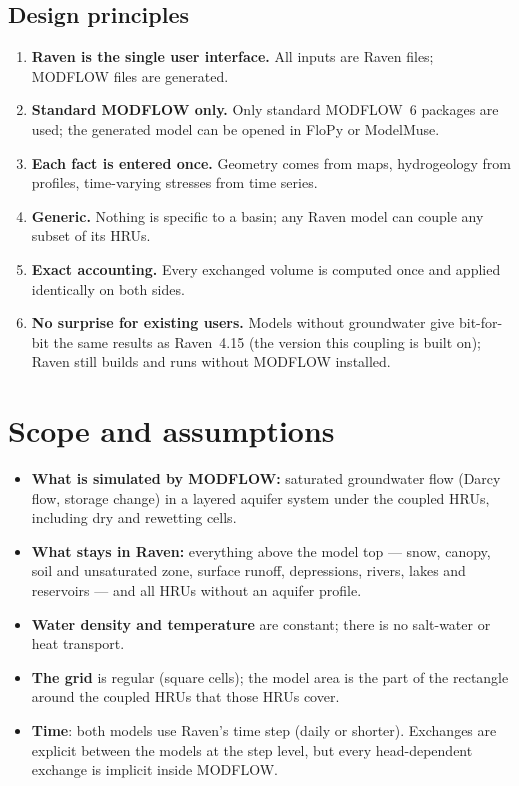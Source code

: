 \subsection{Design principles}
\begin{enumerate}
\item \textbf{Raven is the single user interface.} All inputs are Raven files; MODFLOW files are generated.
\item \textbf{Standard MODFLOW only.} Only standard MODFLOW~6 packages are used; the generated model can be opened in
FloPy or ModelMuse.
\item \textbf{Each fact is entered once.} Geometry comes from maps, hydrogeology from profiles, time-varying stresses
from time series.
\item \textbf{Generic.} Nothing is specific to a basin; any Raven model can couple any subset of its HRUs.
\item \textbf{Exact accounting.} Every exchanged volume is computed once and applied identically on both sides.
\item \textbf{No surprise for existing users.} Models without groundwater give bit-for-bit the same results as
Raven~4.15 (the version this coupling is built on); Raven still builds and runs without MODFLOW installed.
\end{enumerate}

\section{Scope and assumptions}
\begin{itemize}
\item \textbf{What is simulated by MODFLOW:} saturated groundwater flow (Darcy flow, storage change) in a layered aquifer
system under the coupled HRUs, including dry and rewetting cells.
\item \textbf{What stays in Raven:} everything above the model top --- snow, canopy, soil and unsaturated zone, surface
runoff, depressions, rivers, lakes and reservoirs --- and all HRUs without an aquifer profile.
\item \textbf{Water density and temperature} are constant; there is no salt-water or heat transport.
\item \textbf{The grid} is regular (square cells); the model area is the part of the rectangle around the coupled HRUs
that those HRUs cover.
\item \textbf{Time}: both models use Raven's time step (daily or shorter). Exchanges are explicit between the models at
the step level, but every head-dependent exchange is implicit inside MODFLOW.
\end{itemize}

